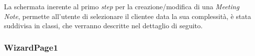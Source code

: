 

La schermata inerente al primo \emph{step} per la creazione/modifica di una \emph{Meeting Note}, permette all'utente di selezionare il \gls{cliente}\glsoccur e data la sua complessità, è stata suddivisa in classi, che verranno descritte nel dettaglio di seguito. 

\subsubsection*{WizardPage1}
\label{subsubsec:wizard-page-1}

